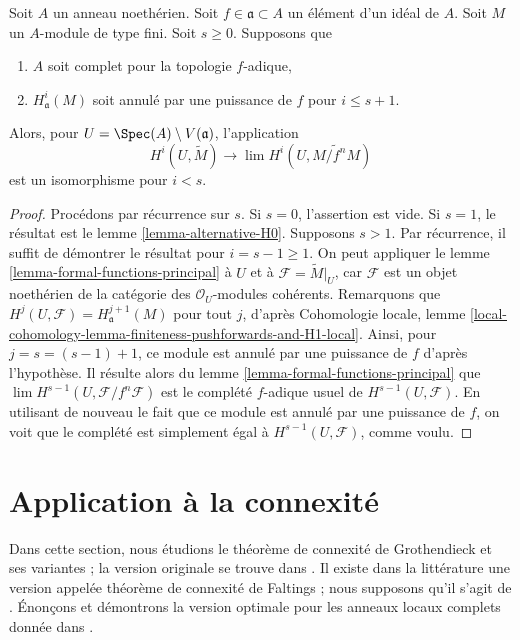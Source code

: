 \begin{lemma}
\label{lemma-alternative-higher}
Soit $A$ un anneau noethérien. Soit $f \in \mathfrak a \subset A$
un élément d'un idéal de $A$. Soit $M$ un $A$-module de type fini.
Soit $s \geq 0$. Supposons que
\begin{enumerate}
\item $A$ soit complet pour la topologie $f$-adique,
\item $H^i_\mathfrak a(M)$ soit annulé par une puissance de $f$
pour $i \leq s + 1$.
\end{enumerate}
Alors, pour $U = \Spec(A) \setminus V(\mathfrak a)$, l'application
$$
H^i(U, \widetilde{M})
\longrightarrow
\lim H^i(U, \widetilde{M/f^nM})
$$
est un isomorphisme pour $i < s$.
\end{lemma}

\begin{proof}
Procédons par récurrence sur $s$. Si $s = 0$, l'assertion est vide. Si $s = 1$, le
résultat est le lemme \ref{lemma-alternative-H0}. Supposons $s > 1$. Par récurrence,
il suffit de démontrer le résultat pour $i = s - 1 \geq 1$.
On peut appliquer le lemme \ref{lemma-formal-functions-principal}
à $U$ et à $\mathcal{F} = \widetilde{M}|_U$,
car $\mathcal{F}$ est un objet noethérien de
la catégorie des $\mathcal{O}_U$-modules cohérents.
Remarquons que $H^j(U, \mathcal{F}) = H^{j + 1}_\mathfrak a(M)$ pour tout $j$, d'après
Cohomologie locale, lemme
\ref{local-cohomology-lemma-finiteness-pushforwards-and-H1-local}.
Ainsi, pour $j = s = (s - 1) + 1$, ce module est
annulé par une puissance de $f$ d'après l'hypothèse.
Il résulte alors du
lemme \ref{lemma-formal-functions-principal} que
$\lim H^{s - 1}(U, \mathcal{F}/f^n\mathcal{F})$
est le complété $f$-adique usuel de $H^{s - 1}(U, \mathcal{F})$.
En utilisant de nouveau le fait que ce module est annulé par une puissance de
$f$, on voit que le complété est simplement égal à $H^{s - 1}(U, \mathcal{F})$,
comme voulu.
\end{proof}





\section{Application à la connexité}
\label{section-connected}

\noindent
Dans cette section, nous étudions le théorème de connexité de Grothendieck
et ses variantes ; la version originale se trouve dans
\cite[Exposee XIII, théorème 2.1]{SGA2}. Il existe dans la littérature une version
appelée théorème de connexité de Faltings ;
nous supposons qu'il s'agit de \cite[théorème 6]{Faltings-some}.
Énonçons et démontrons la version optimale pour les anneaux locaux
complets donnée dans \cite[théorème 1.6]{Varbaro}.

